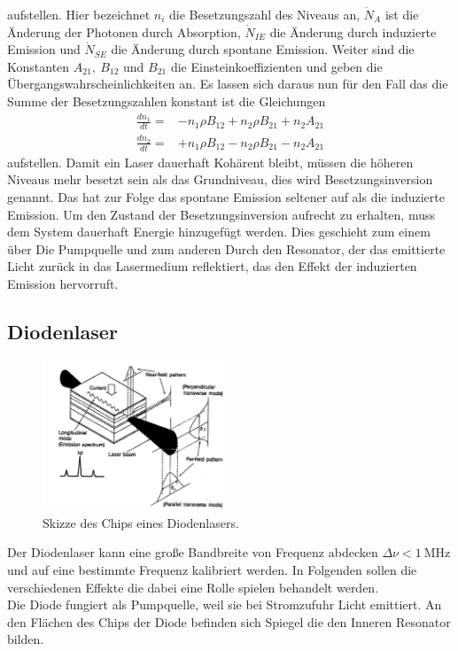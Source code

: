 aufstellen. Hier bezeichnet $n_i$ die Besetzungszahl des Niveaus an, $\dot{N}_A$ ist die Änderung der Photonen durch Absorption, $\dot{N}_{IE}$ die Änderung durch induzierte Emission und $\dot{N}_{SE}$ die Änderung durch spontane Emission.
Weiter sind die Konstanten $A_{21},\ B_{12}$ und $B_{21}$ die Einsteinkoeffizienten und geben die Übergangswahrscheinlichkeiten an.
Es lassen sich daraus nun für den Fall das die Summe der Besetzungszahlen konstant ist die Gleichungen
\begin{align}
	\frac{dn_1}{dt}=&-n_1\rho B_{12}+n_2\rho B_{21}+n_2A_{21}\\
	\frac{dn_2}{dt}=&+n_1\rho B_{12}- n_2\rho B_{21}-n_2A_{21}
\end{align}
aufstellen.
Damit ein Laser dauerhaft Kohärent bleibt, müssen die höheren Niveaus mehr besetzt sein als das Grundniveau, dies wird Besetzungsinversion genannt. 
Das hat zur Folge das spontane Emission seltener auf als die induzierte  Emission.
Um den Zustand der Besetzungsinversion aufrecht zu erhalten, muss dem System dauerhaft Energie hinzugefügt werden.
Dies geschieht zum einem über Die Pumpquelle und zum anderen Durch den Resonator, der das emittierte Licht zurück in das Lasermedium reflektiert, das den Effekt der induzierten Emission hervorruft.
\subsection{Diodenlaser}
\begin{figure}[h!]
	\centering
	\includegraphics[width = 0.5\textwidth]{../Grafiken/Schematische_Ansicht_Laserdiode.pdf}
	\caption{Skizze des Chips eines Diodenlasers.\cite{V60}}
\end{figure}
Der Diodenlaser kann eine große Bandbreite von Frequenz abdecken $\Delta \nu<\SI{1}{\mega\hertz}$ und auf eine bestimmte Frequenz kalibriert werden. 
In Folgenden sollen die verschiedenen Effekte die dabei eine Rolle spielen behandelt werden.\\
Die Diode fungiert als Pumpquelle, weil sie bei Stromzufuhr Licht emittiert. 
An den Flächen des Chips der Diode befinden sich Spiegel die den Inneren Resonator bilden.
